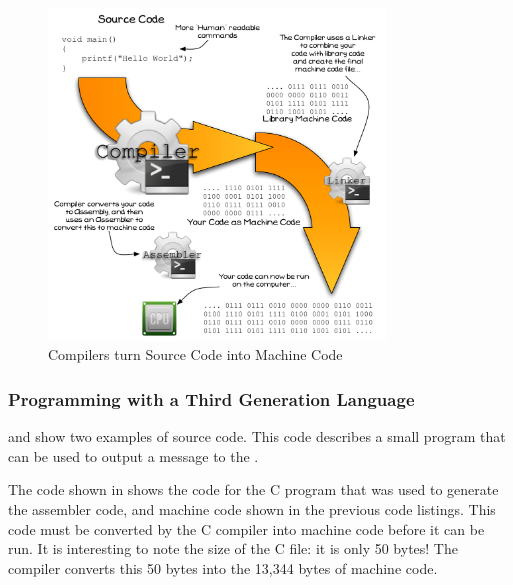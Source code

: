 \begin{figure}[h]
   \centering
   \includegraphics[width=0.8\textwidth]{./topics/programs-and-compilers/diagrams/Compiler} 
   \caption{Compilers turn Source Code into Machine Code}
   \label{fig:compiler}
\end{figure}

\clearpage
\subsubsection{Programming with a Third Generation Language} %
\label{ssub:programming_with_a_third_generation_language}

 and  show two examples of source code. This code describes a small program that can be used to output a message to the .

\begin{multicols}{2}
  \columnbreak
\end{multicols}

The code shown in  shows the code for the C program that was used to generate the assembler code, and machine code shown in the previous code listings. This code must be converted by the C compiler into machine code before it can be run. It is interesting to note the size of the C file: it is only 50 bytes! The compiler converts this 50 bytes into the 13,344 bytes of machine code. 

